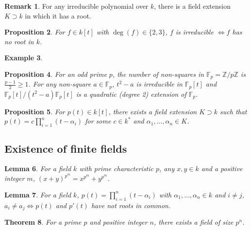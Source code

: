 \documentclass[12pt]{article}
\newtheorem{thm}{Theorem}[section]
\newtheorem{lem}[thm]{Lemma}
\newtheorem{prop}[thm]{Proposition}
\theoremstyle{definition}
\newtheorem{exm}[thm]{Example}
\newtheorem{rmk}[thm]{Remark}
\newcommand{\Z}{\mathbb{Z}}
\newcommand{\F}{\mathbb{F}}
\begin{document}
\begin{rmk}
  For any irreducible polynomial over $k$, there is a field extension $K \supset k$ in which it has a root.
\end{rmk}

\begin{prop}
  For $f \in k[t]$ with $\deg(f) \in \{2, 3\}$, $f$ is irreducible $\iff f$ has no root in $k$.
\end{prop}

\begin{exm}
\end{exm}

\begin{prop}
  For an odd prime $p$, the number of non-squares in $\F_p = \Z / p\Z$ is $\frac{p - 1}{2} \geq 1$.
  For any non-square $a \in \F_p$, $t^2 - a$ is irreducible in $\F_p[t]$ and $\F_p[t] / (t^2 - a)\F_p[t]$ is a quadratic (degree 2) extension of $\F_p$.
\end{prop}

\begin{prop}
  For $p(t) \in k[t]$, there exists a field extension $K \supset k$ such that $p(t) = c\prod_{i = 1}^n(t - \alpha_i)$ for some $c \in k^{\ast}$ and $\alpha_1, \ldots, \alpha_n \in K$.
\end{prop}

\subsection{Existence of finite fields}

\begin{lem}
  For a field $k$ with prime characteristic $p$, any $x, y \in k$ and a positive integer $m$, $(x + y)^{p^m} = x^{p^m} + y^{p^m}$.
\end{lem}

\begin{lem}
  For a field $k$, $p(t) = \prod_{i = 1}^n(t - \alpha_i)$ with $\alpha_1, \ldots, \alpha_n \in k$ and $i \neq j$, $a_i \neq a_j \iff p(t)$ and $p'(t)$ have not roots in common.
\end{lem}

\begin{thm}
  For a prime $p$ and positive integer $n$, there exists a field of size $p^n$.
\end{thm}
\end{document}
